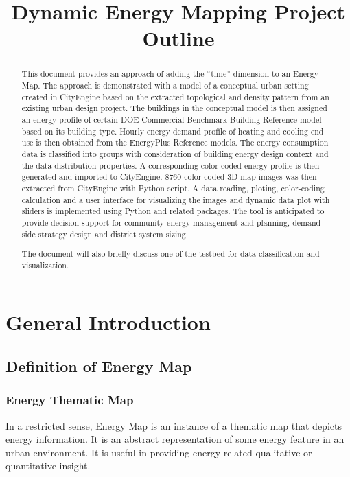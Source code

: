 \documentclass[12pt]{article}
\begin{document}
\title{Dynamic Energy Mapping Project Outline}
\maketitle
\tableofcontents
\newpage
\begin{abstract}
  This document provides an approach of adding the ``time'' dimension
  to an Energy Map. The approach is demonstrated with a model of a
  conceptual urban setting created in CityEngine based on the
  extracted topological and density pattern from an existing urban
  design project. The buildings in the conceptual model is then
  assigned an energy profile of certain DOE Commercial Benchmark
  Building Reference model based on its building type. Hourly energy
  demand profile of heating and cooling end use is then obtained from
  the EnergyPlus Reference models. The energy consumption data is
  classified into groups with consideration of building energy design
  context and the data distribution properties. A corresponding color
  coded energy profile is then generated and imported to
  CityEngine. 8760 color coded 3D map images was then extracted from
  CityEngine with Python script. A data reading, ploting,
  color-coding calculation and a user interface for visualizing the
  images and dynamic data plot with sliders is implemented using
  Python and related packages. The tool is anticipated to provide
  decision support for community energy management and
  planning, demand-side strategy design and district system sizing.
  
  The document will also briefly discuss one of the testbed for data
  classification and visualization.
\end{abstract}
\newpage
\section{General Introduction}
\subsection{Definition of Energy Map}
\subsubsection{Energy Thematic Map}
In a restricted sense, Energy Map is an instance of a thematic map
that depicts energy information. It is an abstract representation of
some energy feature in an urban environment. It is useful in providing
energy related qualitative or quantitative insight. 
\end{document}
